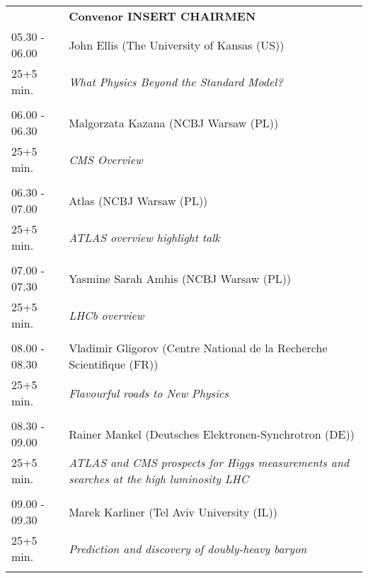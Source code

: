 \begin{longtable}{p{3cm}p{13cm}}
&\hfill {\bf Convenor INSERT CHAIRMEN }\\ 
05.30 - 06.00 & John Ellis (The University of Kansas (US))\\ 
25+5 min. & {\it What Physics Beyond the Standard Model?}\\ 
 & \\ 
06.00 - 06.30 & Malgorzata Kazana (NCBJ Warsaw (PL))\\ 
25+5 min. & {\it CMS Overview}\\ 
 & \\ 
06.30 - 07.00 & Atlas (NCBJ Warsaw (PL))\\ 
25+5 min. & {\it ATLAS overview highlight talk}\\ 
 & \\ 
07.00 - 07.30 & Yasmine Sarah Amhis (NCBJ Warsaw (PL))\\ 
25+5 min. & {\it LHCb overview}\\ 
 & \\ 
08.00 - 08.30 & Vladimir Gligorov (Centre National de la Recherche Scientifique (FR))\\ 
25+5 min. & {\it Flavourful roads to New Physics}\\ 
 & \\ 
08.30 - 09.00 & Rainer Mankel (Deutsches Elektronen-Synchrotron (DE))\\ 
25+5 min. & {\it ATLAS and CMS prospects for Higgs measurements and searches at the high luminosity LHC}\\ 
 & \\ 
09.00 - 09.30 & Marek Karliner (Tel Aviv University (IL))\\ 
25+5 min. & {\it Prediction and discovery of doubly-heavy baryon}\\ 
 & \\ 
\end{longtable}

